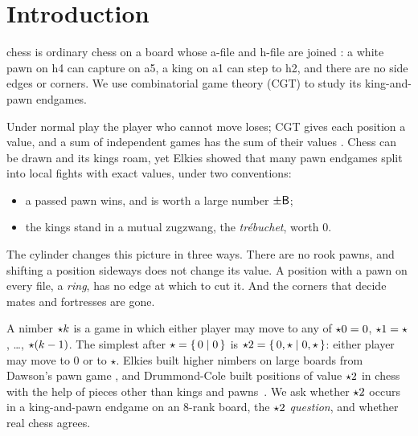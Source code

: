\section{Introduction}\label{sec:intro}

 chess is ordinary chess on a board whose a-file and h-file are joined
\cite{Pritchard}: a white pawn on h4 can capture on a5, a king on a1 can step to h2, and there are no side edges or
corners. We use combinatorial game theory (CGT) to study its king-and-pawn endgames.

Under normal play the player who cannot move loses; CGT gives each position a value, and a sum of independent
games has the sum of their values \cite{ONAG,WinningWays,Siegel2013}. Chess can be drawn and its kings roam,
yet Elkies \cite{Elkies1996} showed that many pawn endgames split into local fights with exact values, under
two conventions:
\begin{itemize}
\item a passed pawn wins, and is worth a large number $\pm\mathsf{B}$;
\item the kings stand in a mutual zugzwang, the \emph{tr\'ebuchet}, worth $0$.
\end{itemize}

The cylinder changes this picture in three ways. There are no rook pawns, and shifting a position sideways
does not change its value. A position with a pawn on every file, a \emph{ring}, has no edge at which to cut
it. And the corners that decide mates and fortresses are gone.

A nimber $\mathord{\star k}$ is a game in which either player may move to any of $\mathord{\star0}=0$, $\mathord{\star1}=\star$,
\dots, $\mathord{\star(k-1)}$. The simplest after $\star=\{\,0 \mid 0\,\}$ is $\mathord{\star2}=\{\,0,\star \mid 0,\star\,\}$: either player
may move to $0$ or to $\star$. Elkies built higher nimbers on large boards from Dawson's pawn game \cite{Elkies2002,Dawson1935}, and
Drummond-Cole built positions of value $\mathord{\star2}$ in chess with the help of pieces other than kings and
pawns~\cite{DrummondCole2005}. We ask whether $\mathord{\star2}$ occurs in a king-and-pawn endgame on an 8-rank board,
the \emph{$\mathord{\star2}$ question}, and whether real chess agrees.


